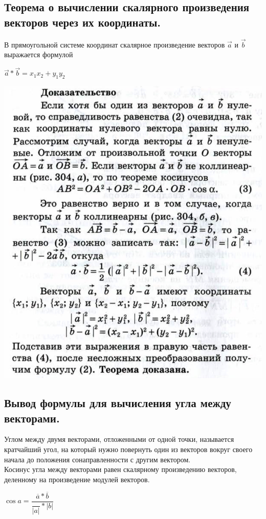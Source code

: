\documentclass[12pt, letterpaper]{article}
\begin{document}
\subsection {Теорема о вычислении скалярного произведения векторов через их координаты.}
В прямоугольной системе координат скалярное произведение векторов $\vec{a}$ и $\vec{b}$ выражается формулой \\
\begin{center}
$\vec{a}*\vec{b}={x_1}{x_2}+{y_1}{y_2}$
\end{center}
\includegraphics[scale=0.3]{photo2.jpg} \\
\subsection {Вывод формулы для вычисления угла между векторами.}
Углом между двумя векторами, отложенными от одной точки, называется кратчайший угол, на который нужно повернуть один из векторов вокруг своего начала до положения сонаправленности с другим вектором. \\
Косинус угла между векторами равен скалярному произведению векторов, деленному на произведение модулей векторов. \\
\begin{center}
$ \cos a =\dfrac{\overline{a}*\overline{b}}{\dfrac{}{\left|a\right|}*{\left|b\right|}} $
\end{center}
\end{document}
